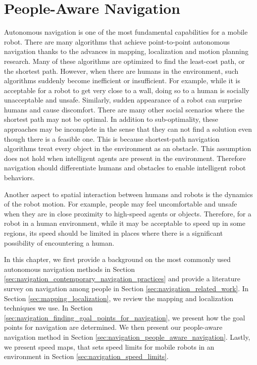 

\chapter{People-Aware Navigation}
\label{chapter:navigation_among_people}

Autonomous navigation is one of the most fundamental capabilities for a mobile robot. There are many algorithms that achieve point-to-point autonomous navigation thanks to the advances in mapping, localization and motion planning research. Many of these algorithms are optimized to find the least-cost path, or the shortest path. However, when there are humans in the environment, such algorithms suddenly become inefficient or insufficient. For example, while it is acceptable for a robot to get very close to a wall, doing so to a human is socially unacceptable and unsafe. Similarly, sudden appearance of a robot can surprise humans and cause discomfort. There are many other social scenarios where the shortest path may not be optimal. In addition to sub-optimality, these approaches may be incomplete in the sense that they can not find a solution even though there is a feasible one. This is because shortest-path navigation algorithms treat every object in the environment as an obstacle. This assumption does not hold when intelligent agents are present in the environment. Therefore navigation should differentiate humans and obstacles to enable intelligent robot behaviors.

Another aspect to spatial interaction between humans and robots is the dynamics of the robot motion. For example, people may feel uncomfortable and unsafe when they are in close proximity to high-speed agents or objects. Therefore, for a robot in a human environment, while it may be acceptable to speed up in some regions, its speed should be limited in places where there is a significant possibility of encountering a human.

In this chapter, we first provide a background on the most commonly used autonomous navigation methods in Section \ref{sec:navigation_contemporary_navigation_practices} and provide a literature survey on navigation among people in Section \ref{sec:navigation_related_work}. In Section \ref{sec:mapping_localization}, we review the mapping and localization techniques we use. In Section \ref{sec:navigation_finding_goal_points_for_navigation}, we present how the goal points for navigation are determined. We then present our people-aware navigation method in Section \ref{sec:navigation_people_aware_navigation}. Lastly, we present speed maps, that sets speed limits for mobile robots in an environment in Section \ref{sec:navigation_speed_limits}.


